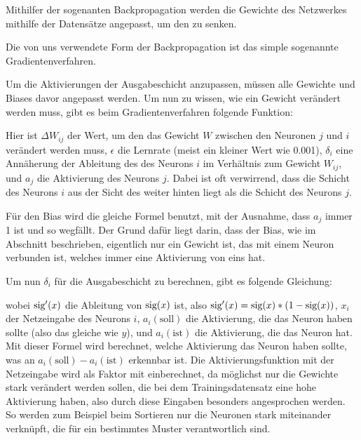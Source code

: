 \documentclass[11pt]{scrartcl}
\begin{document}

	Mithilfer der sogenanten Backpropagation werden die Gewichte des Netzwerkes mithilfe der Datensätze angepasst, um den  zu senken.

	Die von uns verwendete Form der Backpropagation ist das simple sogenannte Gradientenverfahren.

	Um die Aktivierungen der Ausgabeschicht anzupassen, müssen alle Gewichte und Biases davor angepasst werden. Um nun zu wissen, wie ein Gewicht verändert werden muss, gibt es beim Gradientenverfahren folgende Funktion:

	\form{\[
		\Delta W_{ij} = \epsilon * \delta_i * a_j
	\]}
%
	Hier ist  $\Delta W_{ij}$ der Wert, um den das Gewicht $W$ zwischen den Neuronen $j$ und $i$ verändert werden muss, $\epsilon$ die Lernrate (meist ein kleiner Wert wie 0.001), $\delta_i$ eine Annäherung der Ableitung des  des Neurons $i$ im Verhältnis zum Gewicht $W_{ij}$, und $a_j$ die Aktivierung des Neurons $j$. Dabei ist oft verwirrend, dass die Schicht des Neurons $i$ aus der Sicht des  weiter hinten liegt als die Schicht des Neurons $j$.
	

	Für den Bias wird die gleiche Formel benutzt, mit der Ausnahme, dass $a_j$ immer 1 ist und so wegfällt. Der Grund dafür liegt darin, dass der Bias, wie im Abschnitt \hyperref[forward-prop]{} beschrieben, eigentlich nur ein Gewicht ist, das mit einem Neuron verbunden ist, welches immer eine Aktivierung von eins hat.

	Um nun $\delta_i$ für die Ausgabeschicht zu berechnen, gibt es folgende Gleichung: 

	\form{\[
		\delta_i = \sig '\left(x_i\right) * (a_i (\textrm{soll}) - a_i (\textrm{ist})) 
	\]}
%
	wobei $\textrm{sig} '(x)$ die Ableitung von $\textrm{sig}(x)$ ist, also $\textrm{sig}'(x) = \textrm{sig}(x) * (1 - \textrm{sig}(x))$, $x_i$ der Netzeingabe des Neurons $i$, $a_i(\textrm{soll})$ die Aktivierung, die das Neuron haben sollte (also das gleiche wie $y$), und $a_i(\textrm{ist})$ die Aktivierung, die das Neuron hat.
%
	Mit dieser Formel wird berechnet, welche Aktivierung das Neuron haben sollte, was an $a_i(\textrm{soll}) - a_i(\textrm{ist})$ erkennbar ist. Die Aktivierungsfunktion mit der Netzeingabe wird als Faktor mit einberechnet, da möglichst nur die Gewichte stark verändert werden sollen, die bei dem Trainingsdatensatz eine hohe Aktivierung haben, also durch diese Eingaben besonders angesprochen werden. So werden zum Beispiel beim Sortieren nur die Neuronen stark miteinander verknüpft, die für ein bestimmtes Muster verantwortlich sind.
	
\end{document}
